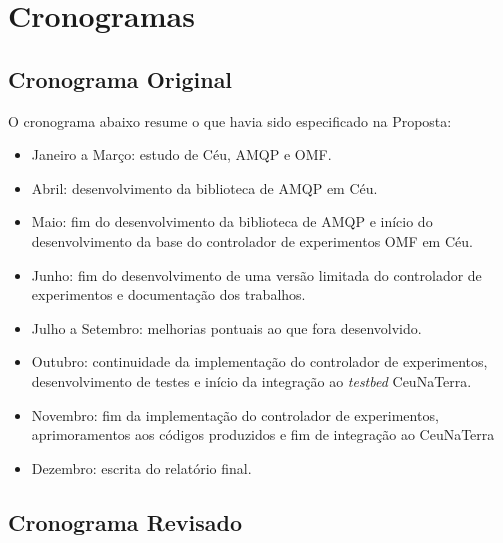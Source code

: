\chapter{Cronogramas}

\section{Cronograma Original}

O cronograma abaixo resume o que havia sido especificado na Proposta:
\begin{itemize}  
\item Janeiro a Março: estudo de Céu, AMQP e OMF.
\item Abril: desenvolvimento da biblioteca de AMQP em Céu.
\item Maio: fim do desenvolvimento da biblioteca de AMQP e início do desenvolvimento da base do controlador de experimentos OMF em Céu.
\item Junho: fim do desenvolvimento de uma versão limitada do controlador de experimentos e documentação dos trabalhos.
\item Julho a Setembro: melhorias pontuais ao que fora desenvolvido.
\item Outubro: continuidade da implementação do controlador de experimentos, desenvolvimento de testes e início da integração ao \textit{testbed} CeuNaTerra.
\item Novembro: fim da implementação do controlador de experimentos, aprimoramentos aos códigos produzidos e fim de integração ao CeuNaTerra
\item Dezembro: escrita do relatório final.
\end{itemize}

\section{Cronograma Revisado}


